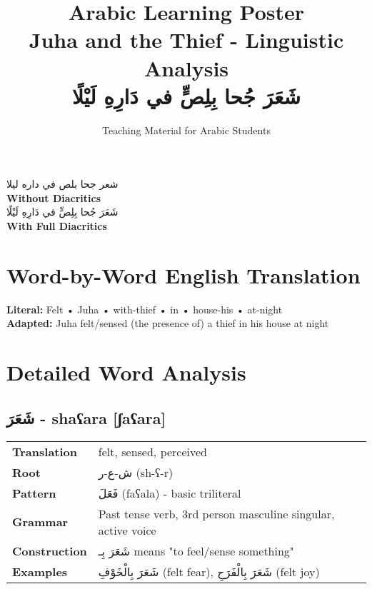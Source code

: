 \documentclass[a4paper,12pt]{article}
\begin{document}

\title{\textbf{\Large Arabic Learning Poster}\\
\large Juha and the Thief - Linguistic Analysis\\
\normalsize \textarabic{شَعَرَ جُحا بِلِصٍّ في دَارِهِ لَيْلًا}}


\author{Teaching Material for Arabic Students}
\date{}



\maketitle

\begin{tcolorbox}[colback=boxcolor,colframe=headercolor,title=\textbf{Arabic Text Analysis}]
\centering
\textarabic{شعر جحا بلص في داره ليلا}
\\[0.5em]
\textbf{Without Diacritics}
\\[1em]
\textarabic{شَعَرَ جُحا بِلِصٍّ في دَارِهِ لَيْلًا}
\\[0.5em]
\textbf{With Full Diacritics}
\end{tcolorbox}

\section{Word-by-Word English Translation}

\begin{tcolorbox}[colback=white,colframe=accentcolor]
\textbf{Literal:} Felt • Juha • with-thief • in • house-his • at-night
\\[0.5em]
\textbf{Adapted:} Juha felt/sensed (the presence of) a thief in his house at night
\end{tcolorbox}

\section{Detailed Word Analysis}

\subsection{\textarabic{شَعَرَ} - \textbf{shaʕara} [ʃaʕara]}

\begin{tabular}{p{3cm}p{10cm}}
\toprule
\textbf{Translation} & felt, sensed, perceived \\
\textbf{Root} & \textarabic{ش-ع-ر} (sh-ʕ-r) \\
\textbf{Pattern} & \textarabic{فَعَلَ} (faʕala) - basic triliteral \\
\textbf{Grammar} & Past tense verb, 3rd person masculine singular, active voice \\
\textbf{Construction} & \textarabic{شَعَرَ بِـ} means "to feel/sense something" \\
\textbf{Examples} & \textarabic{شَعَرَ بِالْخَوْفِ} (felt fear), \textarabic{شَعَرَ بِالْفَرَحِ} (felt joy) \\
\bottomrule
\end{tabular}
\end{document}
